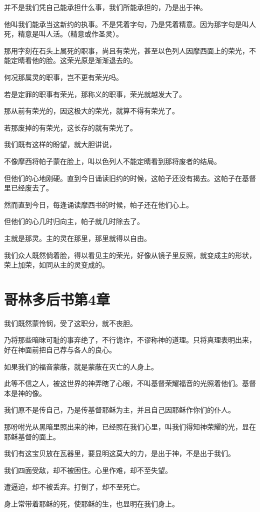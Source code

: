 \documentclass[12pt,oneside]{book}
\begin{document}
并不是我们凭自己能承担什么事，我们所能承担的，乃是出于神。

他叫我们能承当这新约的执事。不是凭着字句，乃是凭着精意。因为那字句是叫人死，精意是叫人活。（精意或作圣灵）。

那用字刻在石头上属死的职事，尚且有荣光，甚至以色列人因摩西面上的荣光，不能定睛看他的脸。这荣光原是渐渐退去的。

何况那属灵的职事，岂不更有荣光吗。

若是定罪的职事有荣光，那称义的职事，荣光就越发大了。

那从前有荣光的，因这极大的荣光，就算不得有荣光了。

若那废掉的有荣光，这长存的就有荣光了。

我们既有这样的盼望，就大胆讲说，

不像摩西将帕子蒙在脸上，叫以色列人不能定睛看到那将废者的结局。

但他们的心地刚硬。直到今日诵读旧约的时候，这帕子还没有揭去。这帕子在基督里已经废去了。

然而直到今日，每逢诵读摩西书的时候，帕子还在他们心上。

但他们的心几时归向主，帕子就几时除去了。

主就是那灵。主的灵在那里，那里就得以自由。

我们众人既然倘着脸，得以看见主的荣光，好像从镜子里反照，就变成主的形状，荣上加荣，如同从主的灵变成的。

\chapter{哥林多后书第4章}
我们既然蒙怜悯，受了这职分，就不丧胆。

乃将那些暗昧可耻的事弃绝了，不行诡诈，不谬称神的道理。只将真理表明出来，好在神面前把自己荐与各人的良心。

如果我们的福音蒙蔽，就是蒙蔽在灭亡的人身上。

此等不信之人，被这世界的神弄瞎了心眼，不叫基督荣耀福音的光照着他们。基督本是神的像。

我们原不是传自己，乃是传基督耶稣为主，并且自己因耶稣作你们的仆人。

那吩咐光从黑暗里照出来的神，已经照在我们心里，叫我们得知神荣耀的光，显在耶稣基督的面上。

我们有这宝贝放在瓦器里，要显明这莫大的力，是出于神，不是出于我们。

我们四面受敌，却不被困住。心里作难，却不至失望。

遭逼迫，却不被丢弃。打倒了，却不至死亡。

身上常带着耶稣的死，使耶稣的生，也显明在我们身上。
\end{document}
